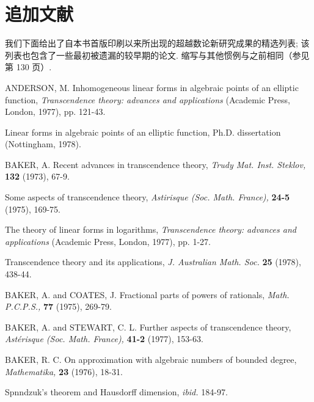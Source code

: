 \chapter*{追加文献}


我们下面给出了自本书首版印刷以来所出现的超越数论新研究成果的精选列表; 该列表也包含了一些最初被遗漏的较早期的论文. 缩写与其他惯例与之前相同（参见第 130 页）.


\begin{hanglist}
    \item ANDERSON, M. Inhomogeneous linear forms in algebraic points of an elliptic function, \textit{Transcendence theory: advances and applications} (Academic Press, London, 1977), pp. 121-43.
    \item \hspace{1.5em} Linear forms in algebraic points of an elliptic function, Ph.D. dissertation (Nottingham, 1978).
    \item BAKER, A. Recent advances in transcendence theory, \textit{Trudy Mat. Inst. Steklov,} \textbf{132} (1973), 67-9.
    \item \hspace{1.5em} Some aspects of transcendence theory, \textit{Astirisque (Soc. Math. France),} \textbf{24-5} (1975), 169-75.
    \item \hspace{1.5em} The theory of linear forms in logarithms, \textit{Transcendence theory: advances and applications} (Academic Press, London, 1977), pp. 1-27.
    \item \hspace{1.5em} Transcendence theory and its applications, \textit{J. Australian Math. Soc.} \textbf{25} (1978), 438-44.
    \item BAKER, A. and COATES, J. Fractional parts of powers of rationals, \textit{Math. P.C.P.S.,} \textbf{77} (1975), 269-79.
    \item BAKER, A. and STEWART, C. L. Further aspects of transcendence theory, \textit{Ast\'{e}risque (Soc. Math. France),} \textbf{41-2} (1977), 153-63.
    \item BAKER, R. C. On approximation with algebraic numbers of bounded degree, \textit{Mathematika,} \textbf{23} (1976), 18-31.
    \item \hspace{1.5em} Spnndzuk's theorem and Hausdorff dimension, \textit{ibid.} 184-97.

\end{hanglist}
